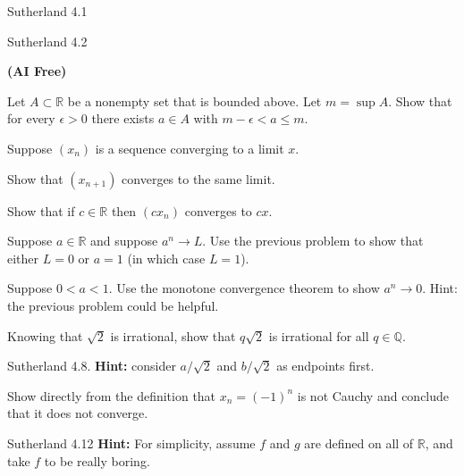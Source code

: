 \documentclass[minion]{homework}
\newcommand{\Reals}{\ensuremath{\mathbb R}}%
\newcommand{\Rats}{\ensuremath{\mathbb Q}} %
\begin{document}
\begin{problems}
\problem Sutherland 4.1

\problem Sutherland 4.2

\problem \textbf{(AI Free)}

Let $A\subset \Reals$ be a nonempty set that is bounded above.
Let $m=\sup A$.  Show that for every $\epsilon>0$ there exists $a\in A$
with $m-\epsilon < a \le m$.

\problem Suppose $(x_n)$ is a sequence converging to a limit $x$.
\begin{subproblems}
\item Show that $(x_{n+1})$ converges to the same limit.
\item Show that if $c\in\Reals$ then $(cx_{n})$ converges to $c x$.
\end{subproblems}

\problem Suppose $a\in\Reals$ and suppose $a^n\to L$. 
Use the previous problem to show that either $L=0$ or 
$a=1$ (in which case $L=1$).

\problem Suppose $0<a<1$.  Use the monotone convergence theorem 
to show $a^n\to 0$. Hint: the previous
problem could be helpful.

\problem 
\begin{subproblems}
\item Knowing that $\sqrt{2}$ is irrational, show that $q\sqrt{2}$ 
is irrational for all $q\in \Rats$.
\item  Sutherland 4.8. \textbf{Hint:} consider $a/\sqrt{2}$ and $b/\sqrt{2}$ as endpoints first.
\end{subproblems}
 
\problem Show directly from the definition that $x_n = (-1)^n$ is not 
Cauchy and conclude that it does not converge.

\problem Sutherland 4.12 \textbf{Hint:} For simplicity, 
assume $f$ and $g$ are defined on all of $\Reals$, and take $f$ 
to be really boring.

\end{problems}
\end{document}
